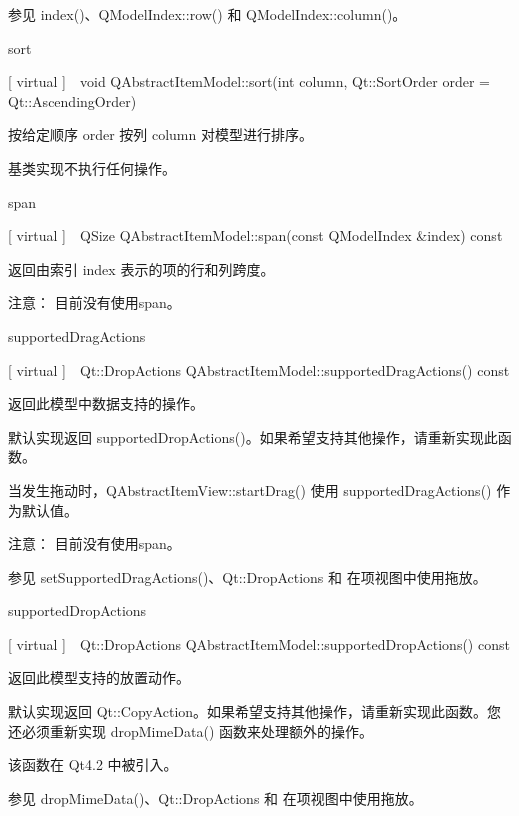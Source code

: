 参见 index()、QModelIndex::row() 和 QModelIndex::column()。

sort

[ virtual ] void QAbstractItemModel::sort(int column, Qt::SortOrder order = Qt::AscendingOrder)

按给定顺序 order 按列 column 对模型进行排序。

基类实现不执行任何操作。

span

[ virtual ] QSize QAbstractItemModel::span(const QModelIndex \&index) const

返回由索引 index 表示的项的行和列跨度。

注意： 目前没有使用span。

supportedDragActions

[ virtual ] Qt::DropActions QAbstractItemModel::supportedDragActions() const

返回此模型中数据支持的操作。

默认实现返回 supportedDropActions()。如果希望支持其他操作，请重新实现此函数。

当发生拖动时，QAbstractItemView::startDrag() 使用 supportedDragActions() 作为默认值。

注意： 目前没有使用span。

参见 setSupportedDragActions()、Qt::DropActions 和 在项视图中使用拖放。

supportedDropActions

[ virtual ] Qt::DropActions QAbstractItemModel::supportedDropActions() const

返回此模型支持的放置动作。

默认实现返回 Qt::CopyAction。如果希望支持其他操作，请重新实现此函数。您还必须重新实现 dropMimeData() 函数来处理额外的操作。

该函数在 Qt4.2 中被引入。

参见 dropMimeData()、Qt::DropActions 和 在项视图中使用拖放。


